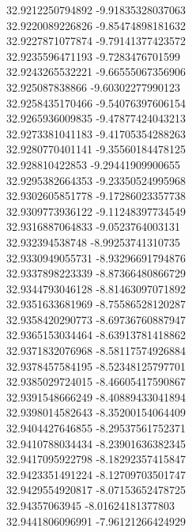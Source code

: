 {32.9212250794892	-9.91835328037063\\
32.9220089226826	-9.85474898181632\\
32.9227871077874	-9.79141377423572\\
32.9235596471193	-9.7283476701599\\
32.9243265532221	-9.66555067356906\\
32.925087838866	-9.60302277990123\\
32.9258435170466	-9.54076397606154\\
32.9265936009835	-9.47877424043213\\
32.9273381041183	-9.41705354288263\\
32.9280770401141	-9.35560184478125\\
32.928810422853	-9.29441909900655\\
32.9295382664353	-9.23350524995968\\
32.9302605851778	-9.17286023357738\\
32.9309773936122	-9.11248397734549\\
32.9316887064833	-9.0523764003131\\
32.932394538748	-8.99253741310735\\
32.9330949055731	-8.93296691794876\\
32.9337898223339	-8.87366480866729\\
32.9344793046128	-8.81463097071892\\
32.9351633681969	-8.75586528120287\\
32.9358420290773	-8.69736760887947\\
32.9365153034464	-8.63913781418862\\
32.9371832076968	-8.58117574926884\\
32.9378457584195	-8.52348125797701\\
32.9385029724015	-8.46605417590867\\
32.9391548666249	-8.40889433041894\\
32.9398014582643	-8.35200154064409\\
32.9404427646855	-8.29537561752371\\
32.9410788034434	-8.23901636382345\\
32.9417095922798	-8.18292357415847\\
32.9423351491224	-8.12709703501747\\
32.9429554920817	-8.07153652478725\\
32.94357063945	-8.01624181377803\\
32.9441806096991	-7.96121266424929\\
}
